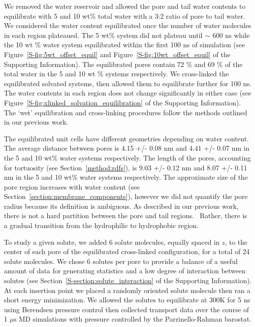 \documentclass[journal=jpcbfk,manuscript=article]{achemso}
\begin{document}
  We removed the water reservoir and allowed the pore and tail water contents
  to equilibrate with 5 and 10 wt\% total water with a 3:2 ratio of pore to tail
  water. We considered the water content equilibrated once the number of water
  molecules in each region plateaued. The 5 wt\% system did not plateau until
  $\sim$ 600 ns while the 10 wt \% water system equilibrated within the first 100
  ns of simulation (see Figure~\ref{S-fig:5wt_offset_equil} and
  Figure~\ref{S-fig:10wt_offset_equil} of the Supporting Information). The
  equilibrated pores contain 72 \% and 69 \% of the total water in the 5 and 10
  wt \% systems respectively. We cross-linked the equilibrated solvated systems,
  then allowed them to equilibrate further for 100 ns. The water contents in
  each region does not change significantly in either case (see
  Figure~\ref{S-fig:xlinked_solvation_equilibration} of the Supporting
  Information). The `wet' equilibration and cross-linking procedures follow the
  methods outlined in our previous work.~\cite{coscia_understanding_2019}
  
  The equilibrated unit cells have different geometries depending on water
  content. The average distance between pores is 4.15 +/- 0.08 nm and 4.41 +/- 0.07 nm
  in the 5 and 10 wt\% water systems respectively. The length of the pores, accounting
  for tortuosity (see Section~\ref{method:rdfs}), is 9.03 +/- 0.12 nm and 8.07 +/- 0.11
  nm in the 5 and 10 wt\% water systems respectively. The approximate size of the pore
  region increases with water content (see Section~\ref{section:membrane_components}), 
  however we did not quantify the pore radius because its definition is ambiguous. As
  described in our previous work, there is not a hard partition between the pore and tail
  regions.~\cite{coscia_understanding_2019} Rather, there is a gradual transition from 
  the hydrophilic to hydrophobic region. 

  To study a given solute, we added 6 solute molecules, equally spaced in $z$, to the
  center of each pore of the equilibrated cross-linked configuration, for a total of 24
  solute molecules. We chose 6 solutes per pore to provide a balance of a useful amount of 
  data for generating statistics and a low degree of interaction between solutes (see 
  Section~\ref{S-section:solute_interaction} of the Supporting Information). At each
  insertion point we placed a randomly oriented solute molecule then ran a short 
  energy minimization. We allowed the solutes to equilibrate at 300K for 5 ns using Berendsen
  pressure control then collected transport data over the course of 1 $\mu$s MD simulations
  with pressure controlled by the Parrinello-Rahman barostat.
\end{document}
